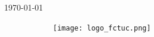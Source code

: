 \begin{titlepage}
\dateenglish
\today\\[0.3in]


\begin{figure}[!ht]
\ \ \ \ \ \ \texttt{[image: logo\_fctuc.png]}
\end{figure}

\end{titlepage}

